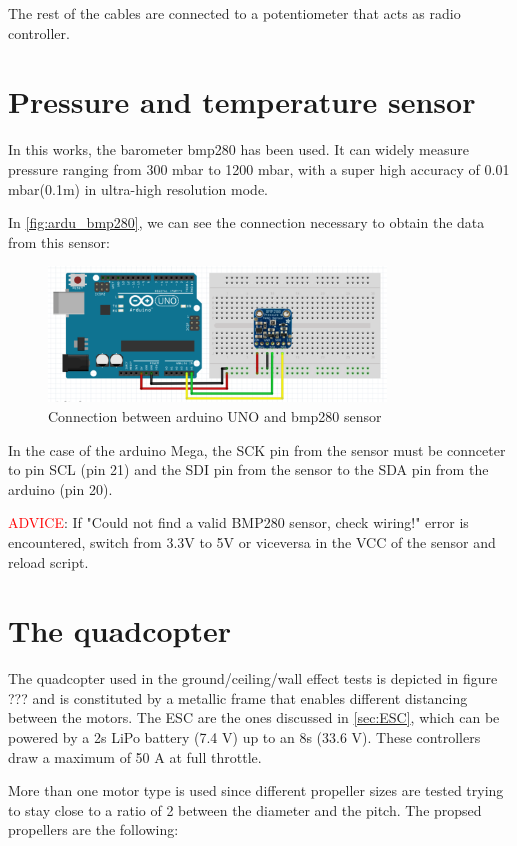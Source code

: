 \documentclass[a4paper]{article}
\begin{document}
{The rest of the cables are connected to a potentiometer that acts as radio controller.

\section{Pressure and temperature sensor}

In this works, the barometer bmp280 has been used. It can widely measure pressure ranging from 300 mbar to 1200 mbar, with a super high accuracy of 0.01 mbar(0.1m) in ultra-high resolution mode.

In \autoref{fig:ardu_bmp280}, we can see the connection necessary to obtain the data from this sensor:

\begin{figure}[h!]
	\centering
	\includegraphics[width=0.8\textwidth]{Images/bmp280.png}
	\caption{Connection between arduino UNO and bmp280 sensor}
	\label{fig:ardu_bmp280}
\end{figure}


In the case of the arduino Mega, the SCK pin from the sensor must be connceter to pin SCL (pin 21) and the SDI pin from the sensor to the SDA pin from the arduino (pin 20).

\textcolor{red}{ADVICE}: If "Could not find a valid BMP280 sensor,  check wiring!" error is encountered, switch from 3.3V to 5V or viceversa in the VCC of the sensor and reload script.

\section{The quadcopter}

The quadcopter used in the ground/ceiling/wall effect tests is depicted in figure ??? and is constituted by a metallic frame that enables different distancing between the motors. The ESC are the ones discussed in \autoref{sec:ESC}, which can be powered by a 2s LiPo battery (7.4 V) up to an 8s (33.6 V). These controllers draw a maximum of 50 A at full throttle.

More than one motor type is used since different propeller sizes are tested trying to stay close to a ratio of 2 between the diameter and the pitch. The propsed propellers are the following:

}
\end{document}

